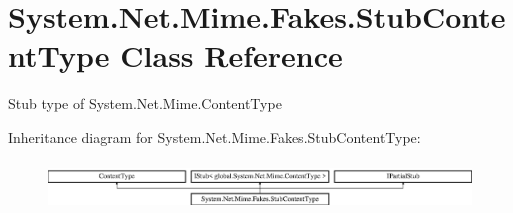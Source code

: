 \hypertarget{class_system_1_1_net_1_1_mime_1_1_fakes_1_1_stub_content_type}{\section{System.\-Net.\-Mime.\-Fakes.\-Stub\-Content\-Type Class Reference}
\label{class_system_1_1_net_1_1_mime_1_1_fakes_1_1_stub_content_type}
}


Stub type of System.\-Net.\-Mime.\-Content\-Type 


Inheritance diagram for System.\-Net.\-Mime.\-Fakes.\-Stub\-Content\-Type\-:\begin{figure}[H]
\begin{center}
\leavevmode
\includegraphics[height=1.323877cm]{class_system_1_1_net_1_1_mime_1_1_fakes_1_1_stub_content_type}
\end{center}
\end{figure}
